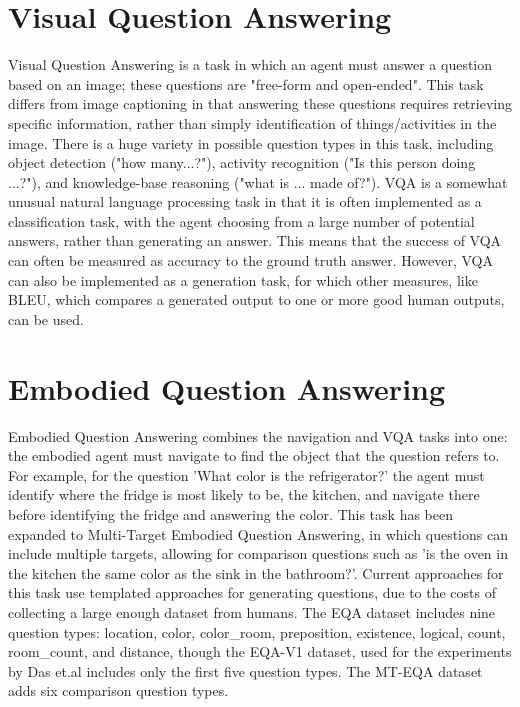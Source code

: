 \section{Visual Question Answering}
Visual Question Answering is a task in which an agent must answer a question based on an image; these questions are "free-form and open-ended"\cite{vqa_2015}. This task differs from image captioning in that answering these questions requires retrieving specific information, rather than simply identification %
of things/activities in the image. There is a huge variety in possible question types in this task, including object detection ("how many...?"), activity recognition ("Is this person doing ...?"), and knowledge-base reasoning ("what is ... made of?"). %
VQA is  a somewhat unusual natural language processing task in that it is often implemented as a classification task, with the agent choosing from a large number of potential answers, rather than generating an answer. %
This means that the success of VQA can often be measured as accuracy to the ground truth answer. However, VQA can also be implemented as a generation task, for which other measures, like BLEU, which compares a generated output to one or more good human outputs, can be used\cite{vqa_survey}\cite{bleu}.

\section{Embodied Question Answering}
Embodied Question Answering combines the navigation and VQA tasks into one: the embodied agent must navigate to find the object that the question refers to\cite{embodiedqa}. For example, for the question 'What color is the refrigerator?' the agent must identify where the fridge is most likely to be, the kitchen, and navigate there before identifying the fridge and answering the color. This task has been expanded to Multi-Target Embodied Question Answering, in which questions can include multiple targets, allowing for comparison questions such as 'is the oven in the kitchen the same color as the sink in the bathroom?'\cite{eqa_multitarget}. Current approaches for this task use templated approaches for generating questions, due to the costs of collecting a large enough dataset from humans.  %
The EQA dataset includes nine question types: location, color, color\_room, preposition, existence, logical, count, room\_count, and distance, though the EQA-V1 dataset, used for the experiments by Das et.al includes only the first five question types\cite{embodiedqa}. The MT-EQA dataset adds six comparison question types\cite{eqa_multitarget}.

